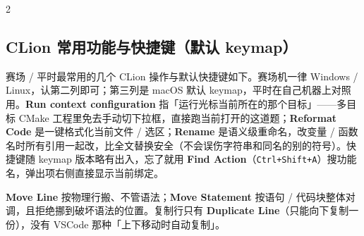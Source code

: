 \begin{multicols*}{2}
\end{multicols*} %

\subsection{CLion 常用功能与快捷键（默认 keymap）}

赛场 / 平时最常用的几个 CLion 操作与默认快捷键如下。赛场机一律 Windows / Linux，认第二列即可；第三列是 macOS 默认 keymap，平时在自己机器上对照用。\textbf{Run context configuration} 指「运行光标当前所在的那个目标」——多目标 CMake 工程里免去手动切下拉框，直接跑当前打开的这道题；\textbf{Reformat Code} 是一键格式化当前文件 / 选区；\textbf{Rename} 是语义级重命名，改变量 / 函数名时所有引用一起改，比全文替换安全（不会误伤字符串和同名的别的符号）。快捷键随 keymap 版本略有出入，忘了就用 \textbf{Find Action}（\texttt{Ctrl+Shift+A}）搜功能名，弹出项右侧直接显示当前绑定。

\textbf{Move Line} 按物理行搬、不管语法；\textbf{Move Statement} 按语句 / 代码块整体对调，且拒绝挪到破坏语法的位置。复制行只有 \textbf{Duplicate Line}（只能向下复制一份），没有 VSCode 那种「上下移动时自动复制」。

